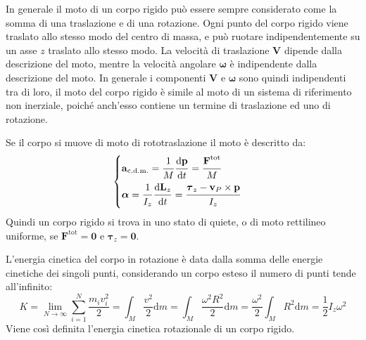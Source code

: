 \documentclass{article}
\newcommand{\vect}[1]{\boldsymbol{\mathbf{#1}}}
\newcommand{\df}{\mathrm{d}}
\numberwithin{equation}{subsection}
\begin{document}
In generale il moto di un corpo rigido può essere sempre considerato come la somma di una traslazione e di una rotazione. Ogni punto del corpo rigido viene traslato 
allo stesso modo del centro di massa, e può ruotare indipendentemente su un asse $z$ traslato allo stesso modo. La velocità di traslazione $\vect{V}$ dipende dalla descrizione 
del moto, mentre la velocità angolare $\vect{\omega}$ è indipendente dalla descrizione del moto. In generale i componenti $\vect{V}$ e $\vect{\omega}$ sono quindi indipendenti 
tra di loro, il moto del corpo rigido è simile al moto di un sistema di riferimento non inerziale, poiché anch'esso contiene un termine di traslazione ed uno di rotazione. 

Se il corpo si muove di moto di rototraslazione il moto è descritto da:
\begin{equation}
    \begin{cases}
        \vect{a}_{\mathrm{c.d.m.}}=\displaystyle\frac{\strut 1}{\strut M}\frac{\strut \df\vect{p}}{\strut \df t}=\frac{\strut \vect{F}^\mathrm{tot}}{\strut M}\\
        \vect{\alpha}=\displaystyle\frac{\strut 1}{\strut I_z}\frac{\strut \df\vect{L}_z}{\strut \df t}=\frac{\strut \vect{\tau}_z-\vect{v}_P\times\vect{p}}{\strut I_z}
    \end{cases}
\end{equation}
Quindi un corpo rigido si trova in uno stato di quiete, o di moto rettilineo uniforme, se $\vect{F}^\mathrm{tot}=\vect{0}$ e $\vect{\tau}_z=\vect{0}$. 





L'energia cinetica del corpo in rotazione è data dalla somma delle energie 
cinetiche dei singoli punti, considerando un corpo esteso il 
numero di punti tende all'infinito:
\begin{equation}
    K=\displaystyle\lim_{N\to\infty}\sum_{i=1}^{N}\frac{m_iv_i^2}{2}=\int_M\frac{v^2}{2}\df m=\int_M\frac{\omega^2R^2}{2}\df m=\frac{\omega^2}{2}\int_M R^2\df m=\frac{1}{2}I_z\omega^2
\end{equation}
Viene così definita l'energia cinetica rotazionale di un corpo rigido. 
\end{document}
